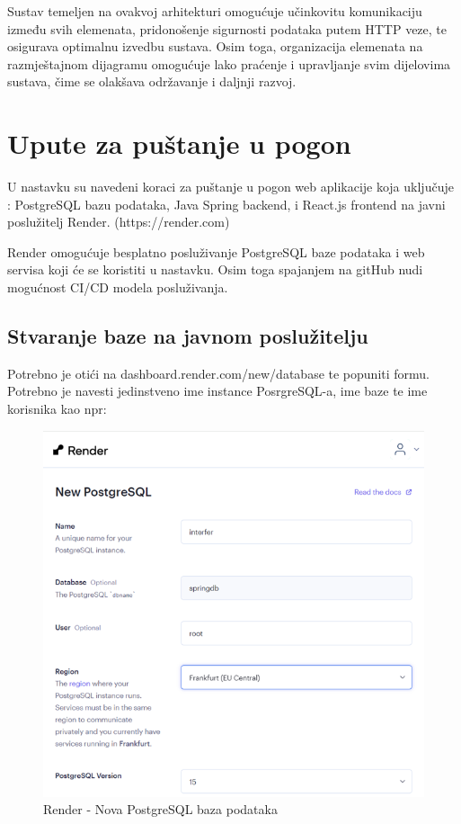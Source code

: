 Sustav temeljen na ovakvoj arhitekturi omogućuje učinkovitu komunikaciju 
između svih elemenata, pridonošenje sigurnosti podataka putem HTTP veze, te 
osigurava optimalnu izvedbu sustava. Osim toga, organizacija elemenata na 
razmještajnom dijagramu omogućuje lako praćenje i upravljanje svim dijelovima 
sustava, čime se olakšava održavanje i daljnji razvoj.
			
			\eject 
		
		\section{Upute za puštanje u pogon}
		
U nastavku su navedeni koraci za puštanje u pogon web aplikacije koja uključuje
: PostgreSQL bazu podataka, Java Spring backend, i React.js frontend na javni 
poslužitelj Render. (https://render.com)

Render omogućuje besplatno posluživanje PostgreSQL baze podataka i web servisa 
koji će se koristiti u nastavku. Osim toga spajanjem na gitHub nudi mogućnost 
CI/CD modela posluživanja.

\subsection{Stvaranje baze na javnom poslužitelju}

Potrebno je otići na dashboard.render.com/new/database te popuniti formu. 
Potrebno je navesti jedinstveno ime instance PosrgreSQL-a, ime baze te ime 
korisnika kao npr:

\begin{figure}[H]
	\includegraphics[scale=0.4]{slike/render_db.png}
	\centering
	\caption{Render - Nova PostgreSQL baza podataka}
	\label{fig:render_db1}
\end{figure}

